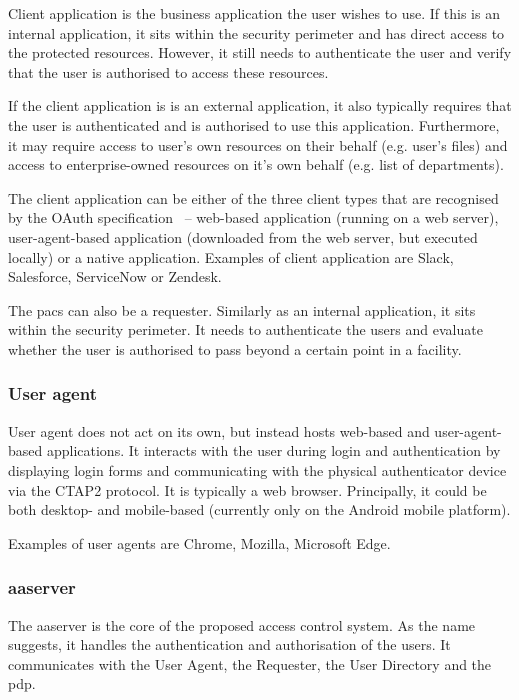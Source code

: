 Client application is the business application the user wishes to use. If this is an internal application, it sits within the security perimeter and has direct access to the protected resources. However, it still needs to authenticate the user and verify that the user is authorised to access these resources.

If the client application is is an external application, it also typically requires that the user is authenticated and is authorised to use this application. Furthermore, it may require access to user's own resources on their behalf (e.g. user's files) and access to enterprise-owned resources on it's own behalf (e.g. list of departments).
    
The client application can be either of the three client types that are recognised by the OAuth specification~\cite{Hardt2012TheFramework} -- web-based application (running on a web server), user-agent-based application (downloaded from the web server, but executed locally) or a native application. Examples of client application are Slack, Salesforce, ServiceNow or Zendesk.

The \acrshort{pacs} can also be a requester. Similarly as an internal application, it sits within the security perimeter. It needs to authenticate the users and evaluate whether the user is authorised to pass beyond a certain point in a facility.

\subsubsection{User agent}
User agent does not act on its own, but instead hosts web-based and user-agent-based applications. It interacts with the user during login and authentication by displaying login forms and communicating with the physical authenticator device via the CTAP2 protocol\footnotemark. It is typically a web browser. Principally, it could be both desktop- and mobile-based (currently only on the Android mobile platform). 
% 

Examples of user agents are Chrome, Mozilla, Microsoft Edge.

\subsubsection{\acrlong{aaserver}} 
The \acrfull{aaserver} is the core of the proposed access control system. As the name suggests, it handles the authentication and authorisation of the users. It communicates with the User Agent, the Requester, the User Directory and the \acrshort{pdp}.
    

